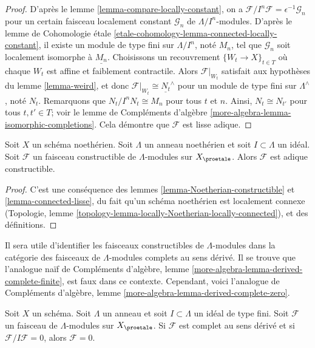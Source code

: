 \begin{proof}
D'après le lemme \ref{lemma-compare-locally-constant}, on a
$\mathcal{F}/I^n\mathcal{F} = \epsilon^{-1}\mathcal{G}_n$
pour un certain faisceau localement constant $\mathcal{G}_n$ de $\Lambda/I^n$-modules. D'après
le lemme de Cohomologie \'etale
\ref{etale-cohomology-lemma-connected-locally-constant},
il existe un module de type fini sur $\Lambda/I^n$, noté $M_n$, tel que
$\mathcal{G}_n$ soit localement isomorphe à $\underline{M_n}$.
Choisissons un recouvrement $\{W_t \to X\}_{t \in T}$ où chaque $W_t$ est
affine et faiblement contractile.
Alors $\mathcal{F}|_{W_t}$ satisfait aux hypothèses du
lemme \ref{lemma-weird},
et donc $\mathcal{F}|_{W_t} \cong \underline{N_t}^\wedge$
pour un module de type fini sur $\Lambda^\wedge$, noté $N_t$. Remarquons que
$N_t/I^nN_t \cong M_n$ pour tous $t$ et $n$. Ainsi,
$N_t \cong N_{t'}$ pour tous $t, t' \in T$; voir le
lemme de Compléments d'algèbre \ref{more-algebra-lemma-isomorphic-completions}.
Cela démontre que $\mathcal{F}$ est lisse adique.
\end{proof}

\begin{lemma}
\label{lemma-Noetherian-adic-constructible}
Soit $X$ un schéma noethérien. Soit $\Lambda$ un anneau noethérien et
soit $I \subset \Lambda$ un idéal. Soit $\mathcal{F}$ un
faisceau constructible de $\Lambda$-modules sur $X_\proetale$. Alors $\mathcal{F}$
est adique constructible.
\end{lemma}

\begin{proof}
C'est une conséquence des lemmes \ref{lemma-Noetherian-constructible} et
\ref{lemma-connected-lisse}, du fait qu'un schéma noethérien
est localement connexe
(Topologie, lemme \ref{topology-lemma-locally-Noetherian-locally-connected}),
et des définitions.
\end{proof}

\noindent
Il sera utile d'identifier les faisceaux constructibles de $\Lambda$-modules
dans la catégorie des faisceaux de $\Lambda$-modules complets au sens dérivé.
Il se trouve que l'analogue naïf de
Compléments d'algèbre, lemme \ref{more-algebra-lemma-derived-complete-finite},
est faux dans ce contexte. Cependant, voici
l'analogue de Compléments d'algèbre, lemme
\ref{more-algebra-lemma-derived-complete-zero}.

\begin{lemma}
\label{lemma-derived-complete-zero}
Soit $X$ un schéma. Soit $\Lambda$ un anneau et soit
$I \subset \Lambda$ un idéal de type fini.
Soit $\mathcal{F}$ un faisceau de $\Lambda$-modules sur $X_\proetale$.
Si $\mathcal{F}$ est complet au sens dérivé et si $\mathcal{F}/I\mathcal{F} = 0$,
alors $\mathcal{F} = 0$.
\end{lemma}

